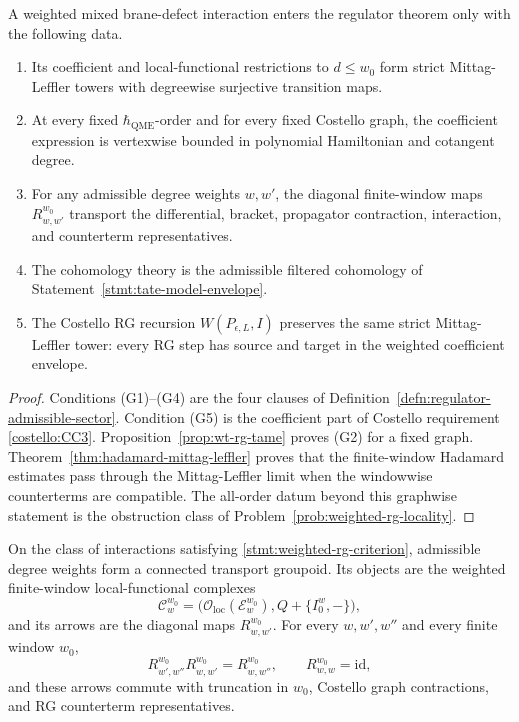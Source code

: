 \begin{stmt}\label{stmt:weighted-rg-criterion}
  A weighted mixed brane-defect interaction enters the regulator theorem
  only with the following data.
  \begin{enumerate}[label=(G\arabic*)]
    \item Its coefficient and local-functional restrictions to
      \(d\leq w_0\) form strict Mittag-Leffler towers with degreewise
      surjective transition maps.
    \item At every fixed \(\hbar_{\mathrm{QME}}\)-order and for every fixed Costello
      graph, the coefficient expression is vertexwise bounded in
      polynomial Hamiltonian and cotangent degree.
    \item For any admissible degree weights \(w,w'\), the diagonal
      finite-window maps \(R^{w_0}_{w,w'}\) transport the differential,
      bracket, propagator contraction, interaction, and counterterm
      representatives.
    \item The cohomology theory is the admissible filtered cohomology of
      Statement~\ref{stmt:tate-model-envelope}.
    \item The Costello RG recursion \(W(P_{\epsilon,L},I)\) preserves
      the same strict Mittag-Leffler tower: every RG step has source and
      target in the weighted coefficient envelope.
  \end{enumerate}
\end{stmt}

\begin{proof}
  Conditions (G1)--(G4) are the four clauses of
  Definition~\ref{defn:regulator-admissible-sector}.  Condition (G5) is
  the coefficient part of Costello requirement \ref{costello:CC3}.
  Proposition~\ref{prop:wt-rg-tame} proves (G2) for a fixed graph.
  Theorem~\ref{thm:hadamard-mittag-leffler} proves that the
  finite-window Hadamard estimates pass through the Mittag-Leffler limit
  when the windowwise counterterms are compatible.  The all-order datum
  beyond this graphwise statement is the obstruction class of
  Problem~\ref{prob:weighted-rg-locality}.
\end{proof}

\begin{thm}
\label{thm:wt-transport-groupoid}
  On the class of interactions satisfying
  \ref{stmt:weighted-rg-criterion}, admissible degree weights form
  a connected transport groupoid.  Its objects are the weighted
  finite-window local-functional complexes
  \[
    \mathcal C_w^{w_0}
      =\bigl(\mathcal O_{\mathrm{loc}}(\mathcal E_w^{w_0}),
      Q+\{I_0^w,-\}\bigr),
  \]
  and its arrows are the diagonal maps \(R^{w_0}_{w,w'}\).  For every
  \(w,w',w''\) and every finite window \(w_0\),
  \[
    R^{w_0}_{w',w''}R^{w_0}_{w,w'}=R^{w_0}_{w,w''},
    \qquad R^{w_0}_{w,w}=\mathrm{id},
  \]
  and these arrows commute with truncation in \(w_0\), Costello graph
  contractions, and RG counterterm representatives.
\end{thm}

